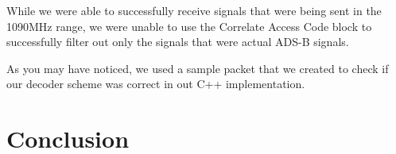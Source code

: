 \documentclass[conference, onecolumn]{IEEEtran}
\begin{document}
While we were able to successfully receive signals that were being sent in the 1090MHz range, we were unable to use the Correlate Access Code block to successfully filter out only the signals that were actual ADS-B signals. 

As you may have noticed, we used a sample packet that we created to check if our decoder scheme was correct in out C++ implementation. 



\section{Conclusion}







\end{document}
